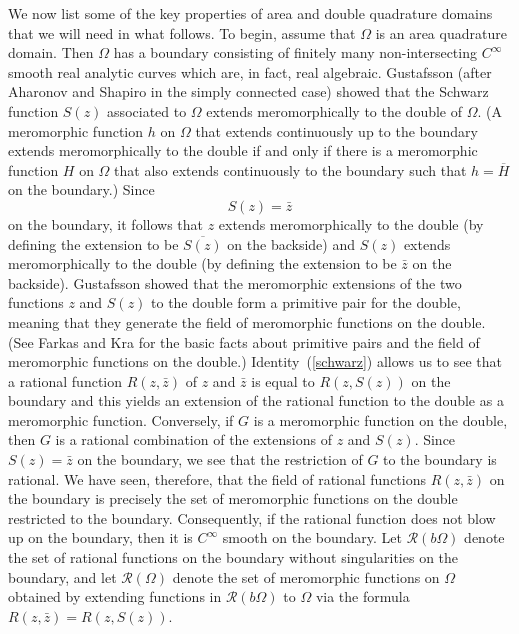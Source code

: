 \documentclass[12pt]{amsart}
\newcommand\Om{\Omega}
\numberwithin{equation}{section}
\begin{document}
We now list some of the key properties of area and
double quadrature domains that we will need in
what follows. To begin, assume that $\Om$ is
an area quadrature domain. Then $\Om$ has a
boundary consisting of finitely many non-intersecting
$C^\infty$ smooth real analytic curves which are, in
fact, real algebraic. Gustafsson \cite{G} (after
Aharonov and Shapiro \cite{AS} in the simply connected
case) showed that the Schwarz function $S(z)$ associated
to $\Om$ extends meromorphically to the double
of $\Om$. (A meromorphic function $h$ on $\Om$ that
extends continuously up to the boundary extends
meromorphically to the double if and only if there
is a meromorphic function $H$ on $\Om$ that also
extends continuously to the boundary such that
$h=\overline{H}$ on the boundary.) Since
\begin{equation}
\label{schwarz}
S(z)=\bar z
\end{equation}
on the boundary, it follows that $z$ extends
meromorphically to the double (by defining the
extension to be $\overline{S(z)}$ on the backside)
and $S(z)$ extends meromorphically to the double
(by defining the extension to be $\bar z$ on
the backside). Gustafsson showed that the meromorphic
extensions of the two functions $z$ and $S(z)$ to
the double form a primitive pair for the double,
meaning that they generate the field of meromorphic
functions on the double. (See Farkas and Kra \cite{FK}
for the basic facts about primitive pairs and the
field of meromorphic functions on the double.)
Identity~(\ref{schwarz}) allows us to see that a
rational function $R(z,\bar z)$ of $z$ and $\bar z$ is
equal to $R(z,S(z))$ on the boundary and this yields an
extension of the rational function to the double as a meromorphic
function. Conversely, if $G$ is a meromorphic function
on the double, then $G$ is a rational combination of
the extensions of $z$ and $S(z)$. Since $S(z)=\bar z$
on the boundary, we see that the restriction of $G$
to the boundary is rational.
We have seen, therefore, that the field of rational
functions $R(z,\bar z)$ on the boundary is precisely
the set of meromorphic functions on the double restricted
to the boundary. Consequently, if the rational
function does not blow up on the boundary, then
it is $C^\infty$ smooth on the boundary. Let
${\mathcal R}(b\Om)$ denote the set of rational functions
on the boundary without singularities on the boundary, and let
${\mathcal R}(\Om)$ denote the set of meromorphic functions
on $\Om$ obtained by extending functions in
${\mathcal R}(b\Om)$ to $\Om$ via the formula
$R(z,\bar z)=R(z,S(z))$.
\end{document}
